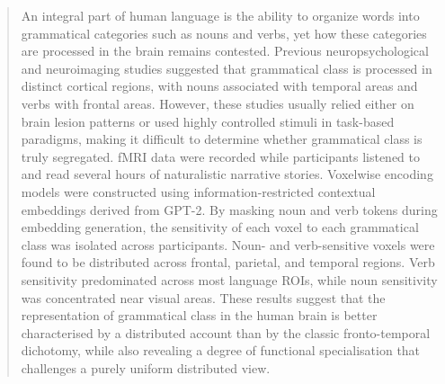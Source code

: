 \documentclass[a4paper]{article}
\begin{document}
\vspace{1cm}
\begin{abstract}
\noindent An integral part of human language is the ability to organize words into grammatical categories such as nouns and verbs, yet how these categories are processed in the brain remains contested. Previous neuropsychological and neuroimaging studies suggested that grammatical class is processed in distinct cortical regions, with nouns associated with temporal areas and verbs with frontal areas. However, these studies usually relied either on brain lesion patterns or used highly controlled stimuli in task-based paradigms, making it difficult to determine whether grammatical class is truly segregated. fMRI data were recorded while participants listened to and read several hours of naturalistic narrative stories. Voxelwise encoding models were constructed using information-restricted contextual embeddings derived from GPT-2. By masking noun and verb tokens during embedding generation, the sensitivity of each voxel to each grammatical class was isolated across participants. Noun- and verb-sensitive voxels were found to be distributed across frontal, parietal, and temporal regions. Verb sensitivity predominated across most language ROIs, while noun sensitivity was concentrated near visual areas. These results suggest that the representation of grammatical class in the human brain is better characterised by a distributed account than by the classic fronto-temporal dichotomy, while also revealing a degree of functional specialisation that challenges a purely uniform distributed view.
\end{abstract}
\newpage
{}
\end{document}
